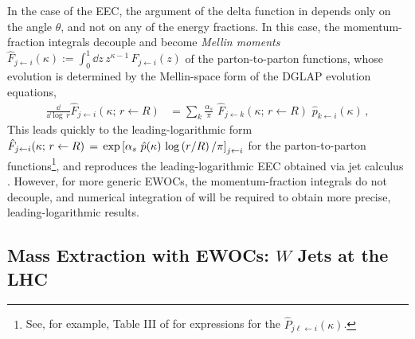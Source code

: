 In the case of the EEC, the argument of the delta function in   depends only on the angle \(\theta\), and not on any of the energy fractions.
%
In this case, the momentum-fraction integrals decouple and become \textit{Mellin moments}
\(
    \hat{F}_{j \leftarrow i}(\kappa)
    :=
    \int_0^1 \dd z \, z^{\kappa-1}\, F_{j \leftarrow i}(z)
\)
of the \gls{parton-to-parton} functions, whose evolution is determined by the Mellin-space form of the DGLAP evolution equations,
\begin{align}
    \frac{\dd}{\dd\log\, r}
    \hat{F}_{j\leftarrow i}(\kappa;\,
    r\leftarrow R)
    &=
    \sum_k
    \frac{\alpha_s}{\pi}
    \,\,
    \hat{F}_{j\leftarrow k}(\kappa;\,r\leftarrow R)
    \,\,
    \hat{p}_{k\leftarrow i}(\kappa)
    \,
    ,
\end{align}
%
This leads quickly to the leading-logarithmic form \(
    \hat{F}_{j\leftarrow i}(\kappa ;\,
    r\leftarrow R)
    \,
    =
    \,
    \exp\left[
        \alpha_s
        \,\,
        \hat{p}(\kappa)
        \,
        \log\left(r/R\right)
        /
        \pi
    \right]_{j \leftarrow i}
\) for the \gls{parton-to-parton} functions\footnote{
See, for example, Table III of  for expressions for the \(\hat P_{j\ell\leftarrow i}(\kappa)\).
}, and reproduces the leading-logarithmic EEC obtained via jet calculus \cite{Konishi:1978dg,Konishi:1978yx,Konishi:1978ks}.
%
However, for more generic EWOCs, the momentum-fraction integrals do not decouple, and numerical integration of  will be required to obtain more precise, leading-logarithmic results.


\subsection{Mass Extraction with EWOCs: \texorpdfstring{\(W\)}{W} Jets at the LHC}
\label{sec:ewoc-mass}

